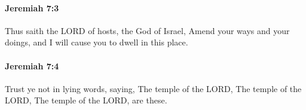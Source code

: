 		\paragraph{Jeremiah 7:3} %
			\label{JEREMIAH-7-3}

			Thus saith the LORD of hosts, the God of Israel, Amend your ways and your doings, and I will cause you to dwell in this place.


		\paragraph{Jeremiah 7:4} %
			\label{JEREMIAH-7-4}

			Trust ye not in lying words, saying, The temple of the LORD, The temple of the LORD, The temple of the LORD, are these.


